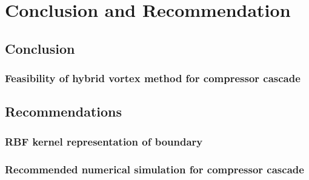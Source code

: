 \chapter{Conclusion and Recommendation}
\label{ch:ConclusionandRecommendation}

\section{Conclusion}

\subsection{Feasibility of hybrid vortex method for compressor cascade}

\section{Recommendations}

\subsection{RBF kernel representation of boundary}

\subsection{Recommended numerical simulation for compressor cascade}
